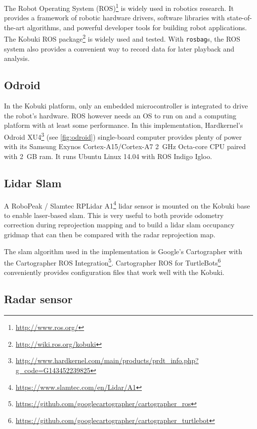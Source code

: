 The Robot Operating System (ROS)\footnote{\url{http://www.ros.org/}} is widely used in robotics research. It provides a framework of robotic hardware drivers, software libraries with state-of-the-art algorithms, and powerful developer tools for building robot applications. The Kobuki ROS package\footnote{\url{http://wiki.ros.org/kobuki}} is widely used and tested. With \texttt{rosbag}s, the ROS system also provides a convenient way to record data for later playback and analysis.

\subsection{Odroid}\label{odroid}

In the Kobuki platform, only an embedded microcontroller is integrated to drive the robot's hardware. ROS however needs an OS to run on and a computing platform with at least some performance. In this implementation, Hardkernel's Odroid XU4\footnote{\url{http://www.hardkernel.com/main/products/prdt_info.php?g_code=G143452239825}} (see \cref{fig:odroid}) single-board computer provides plenty of power with its Samsung Exynos Cortex-A15/Cortex-A7 \SI{2}{GHz} Octa-core CPU paired with \SI{2}{GB} ram. It runs Ubuntu Linux 14.04 with ROS Indigo Igloo.

\subsection{Lidar Slam}\label{lidar}
A RoboPeak / Slamtec RPLidar A1\footnote{\url{https://www.slamtec.com/en/Lidar/A1}} lidar sensor is mounted on the Kobuki base to enable laser-based slam. This is very useful to both provide odometry correction during reprojection mapping and to build a lidar slam occupancy gridmap that can then be compared with the radar reprojection map.

The slam algorithm used in the implementation is Google's Cartographer \cite{Hess2016} with the Cartographer ROS Integration\footnote{\url{https://github.com/googlecartographer/cartographer_ros}}. Cartographer ROS for TurtleBots\footnote{\url{https://github.com/googlecartographer/cartographer_turtlebot}} conveniently provides configuration files that work well with the Kobuki.

\subsection{Radar sensor}\label{radar-sensor}


